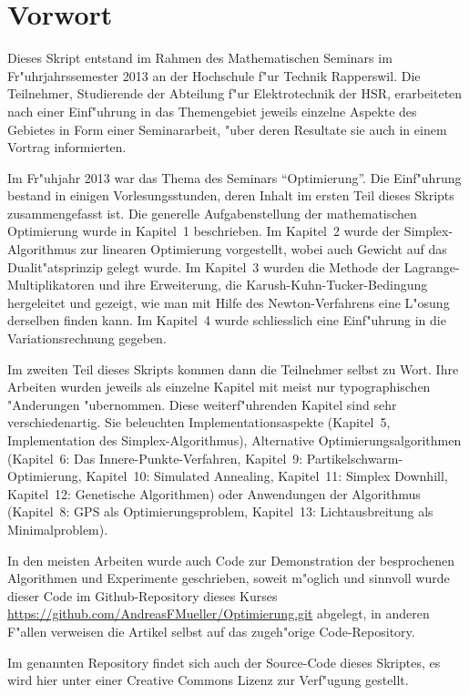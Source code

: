 \chapter*{Vorwort}
Dieses Skript entstand im Rahmen des Mathematischen Seminars
im Fr"uhrjahrssemester 2013 an der Hochschule f"ur Technik Rapperswil.
Die Teilnehmer, Studierende der Abteilung f"ur Elektrotechnik der
HSR, erarbeiteten nach einer Einf"uhrung in das Themengebiet jeweils
einzelne Aspekte des Gebietes in Form einer Seminararbeit, "uber
deren Resultate sie auch in einem Vortrag informierten. 

Im Fr"uhjahr 2013 war das Thema des Seminars ``Optimierung''.
Die Einf"uhrung bestand in einigen Vorlesungsstunden, deren
Inhalt im ersten Teil dieses Skripts zusammengefasst ist.
Die generelle Aufgabenstellung der mathematischen Optimierung
wurde in Kapitel~1 beschrieben.
Im Kapitel~2 wurde der Simplex-Algorithmus zur linearen Optimierung
vorgestellt, wobei auch Gewicht auf das Dualit"atsprinzip gelegt
wurde.
Im Kapitel~3 wurden die Methode der Lagrange-Multiplikatoren
und ihre Erweiterung, die Karush-Kuhn-Tucker-Bedingung hergeleitet
und gezeigt, wie man mit Hilfe des Newton-Verfahrens eine L"osung
derselben finden kann. Im Kapitel~4 wurde schliesslich eine
Einf"uhrung in die Variationsrechnung gegeben.

Im zweiten Teil dieses Skripts kommen dann die Teilnehmer
selbst zu Wort. Ihre Arbeiten wurden jeweils als einzelne
Kapitel mit meist nur typographischen "Anderungen "ubernommen.
Diese weiterf"uhrenden Kapitel sind sehr verschiedenartig.
Sie beleuchten Implementationsaspekte (Kapitel~5, Implementation
des Simplex-Algorithmus), Alternative Optimierungsalgorithmen
(Kapitel~6: Das Innere-Punkte-Verfahren,
Kapitel~9: Partikelschwarm-Optimierung,
Kapitel~10: Simulated Annealing,
Kapitel~11: Simplex Downhill,
Kapitel~12: Genetische Algorithmen) oder Anwendungen
der Algorithmus
(Kapitel~8: GPS als Optimierungsproblem, Kapitel~13: Lichtausbreitung
als Minimalproblem).

In den meisten Arbeiten wurde auch Code zur Demonstration der 
besprochenen Algorithmen und Experimente geschrieben, soweit
m"oglich und sinnvoll wurde dieser Code im Github-Repository
dieses Kurses \url{https://github.com/AndreasFMueller/Optimierung.git}
abgelegt, in anderen F"allen verweisen die Artikel selbst auf
das zugeh"orige Code-Repository.

Im genannten Repository findet sich auch der Source-Code dieses
Skriptes, es wird hier unter einer Creative Commons Lizenz
zur Verf"ugung gestellt.
